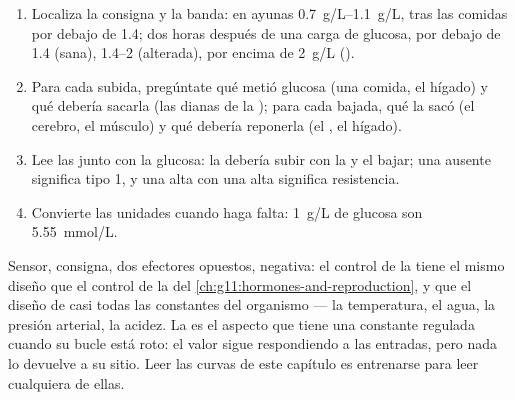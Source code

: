 \begin{method}\label{met:g12:glucose-and-diabetes:read}
\begin{enumerate}
  \item Localiza la consigna y la banda: en ayunas
        \qtyrange{0.7}{1.1}{g/L}, tras las comidas por debajo de
        \num{1.4}; dos horas después de una carga de glucosa, por
        debajo de \num{1.4} (sana), \qtyrange{1.4}{2}{} (alterada),
        por encima de \qty{2}{g/L} ().
  \item Para cada subida, pregúntate qué metió glucosa (una comida, el
        hígado) y qué debería sacarla (las dianas de la ); para
        cada bajada, qué la sacó (el cerebro, el músculo) y qué debería
        reponerla (el , el hígado).
  \item Lee las  junto con la glucosa: la  debería
        subir con la  y el  bajar; una  ausente
        significa tipo 1, y una  alta con una  alta
        significa resistencia.
  \item Convierte las unidades cuando haga falta: \qty{1}{g/L} de
        glucosa son \qty{5.55}{mmol/L}.
\end{enumerate}
\end{method}

\begin{remark}\label{rem:g12:glucose-and-diabetes:model}
Sensor, consigna, dos efectores opuestos,  negativa:
el control de la  tiene el mismo diseño que el control de la
 del \cref{ch:g11:hormones-and-reproduction}, y que el
diseño de casi todas las constantes del organismo --- la temperatura,
el agua, la presión arterial, la acidez. La  es el aspecto que
tiene una constante regulada cuando su bucle está roto: el valor sigue
respondiendo a las entradas, pero nada lo devuelve a su sitio. Leer las
curvas de este capítulo es entrenarse para leer cualquiera de ellas.
\end{remark}

